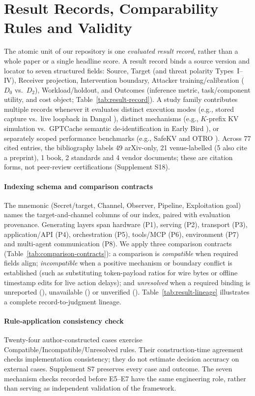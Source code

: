 \section{Result Records, Comparability Rules and Validity}\label{sec:scope}
The atomic unit of our repository is one \emph{evaluated result record}, rather than a whole paper or a single headline score. A result record binds a source version and locator to seven structured fields: Source, Target (and threat polarity Types~I--IV), Receiver projection, Intervention boundary, Attacker training/calibration ($D_0$ vs.\ $D_2$), Workload/holdout, and Outcomes (inference metric, task/component utility, and cost object; Table~\ref{tab:result-record}). A study family contributes multiple records whenever it evaluates distinct execution modes (e.g., stored capture vs.\ live loopback in Dangol \cite{dangol2026workflow}), distinct mechanisms (e.g., $K$-prefix KV simulation vs.\ GPTCache semantic de-identification in Early Bird \cite{earlybird2025}), or separately scoped performance benchmarks (e.g., SafeKV \cite{chu2025safekv} and OTRO \cite{lee2026otro}).
Across 77 cited entries, the bibliography labels 49 arXiv-only, 21 venue-labelled (5 also cite a preprint), 1 book, 2 standards and 4 vendor documents; these are citation forms, not peer-review certifications (Supplement S18).


\paragraph{Indexing schema and comparison contracts}
The mnemonic \scope{} (Secret/target, Channel, Observer, Pipeline, Exploitation goal) names the target-and-channel columns of our index, paired with evaluation provenance. Generating layers span hardware (P1), serving (P2), transport (P3), application/API (P4), orchestration (P5), tools/MCP (P6), environment (P7) and multi-agent communication (P8). We apply three comparison contracts (Table~\ref{tab:comparison-contracts}): a comparison is \emph{compatible} when required fields align; \emph{incompatible} when a positive mechanism or boundary conflict is established (such as substituting token-payload ratios for wire bytes or offline timestamp edits for live action delays); and \emph{unresolved} when a required binding is unreported (\NRR{}), unavailable (\NRA{}) or unverified (\NRV{}). Table~\ref{tab:result-lineage} illustrates a complete record-to-judgment lineage.




\paragraph{Rule-application consistency check}
Twenty-four author-constructed cases exercise Compatible/Incompatible/Unresolved rules. Their construction-time agreement checks implementation consistency; they do not estimate decision accuracy on external cases. Supplement S7 preserves every case and outcome. The seven mechanism checks recorded before E5--E7 have the same engineering role, rather than serving as independent validation of the framework.
